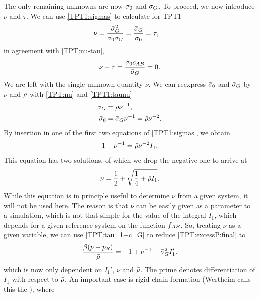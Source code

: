 \documentclass[8.5pt,twoside,twocolumn]{article}
\newcommand\fab{\enmat{f_{AB}}}
\theoremstyle{standard}
\begin{document}
The only remaining unknowns are now $\bar\sigma_0$ and $\bar\sigma_G$. To proceed, we now
introduce $\nu$ and $\tau$. We can use \eqref{TPT1:sigmas} to calculate for TPT1
\begin{equation}
\begin{aligned}
\nu&=\frac{\bar\sigma_G^2}{\bar\sigma_0\bar\sigma_G}=\frac{\bar\sigma_G}{\bar\sigma_0}=\tau,
\end{aligned}
\label{TPT1:taunu}
\end{equation}
in agreement with \eqref{TPT:nu-tau},
\begin{equation}
\nu-\tau=\frac{\bar\sigma_0 c_{AB}}{\bar\sigma_G}=0.
\end{equation}
We are left with the single unknown quantity $\nu$. We can reexpress
$\bar\sigma_0$ and $\bar\sigma_G$ by $\nu$ and $\bar\rho$ with \eqref{TPT:nu} and \eqref{TPT1:taunu}
\begin{equation}
\begin{aligned}
\bar\sigma_G&=\bar\rho\nu^{-1}, \\
\bar\sigma_0&=\bar\sigma_G\nu^{-1}=\bar\rho\nu^{-2}.
\end{aligned}
\end{equation}
By insertion in one of the first two equations of \eqref{TPT1:sigmas}, we obtain
\begin{equation}
1-\nu^{-1}=\bar\rho\nu^{-2}I_1.
\end{equation}
This equation has two solutions, of which we drop the negative one to arrive at
\begin{equation}
\nu=\frac 1 2 + \sqrt{\frac 1 4 + \bar\rho I_1}.
\end{equation}
While this equation is in principle useful to determine $\nu$ from a given system,
it will not be used here. The reason is that $\nu$ can be easily given as a parameter
to a simulation, which is not that simple for the value of the integral $I_1$,
which depends for a given reference system on the function $\fab$. So, treating
$\nu$ as a given variable, we can use \eqref{TPT:tau=1+c_G} to reduce \eqref{TPT:excessP:final}
to
\begin{equation}
\begin{aligned}
\frac{\beta(p-p_R)}{\bar\rho}=-1+\nu^{-1}-\bar\sigma_G^2I_1'.
\end{aligned}
\end{equation}
which is now only dependent on $I_1'$, $\nu$ and $\bar\rho$. The prime denotes
differentiation of $I_1$ with respect to $\bar\rho$. An important case is
rigid chain formation (Wertheim calls this the ), where
\end{document}
